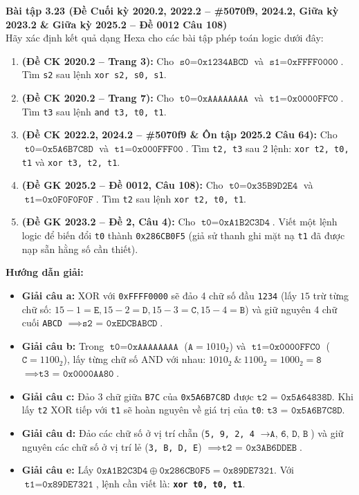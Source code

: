 \textbf{Bài tập 3.23 (Đề Cuối kỳ 2020.2, 2022.2 -- \#5070f9, 2024.2, Giữa kỳ 2023.2 \& Giữa kỳ 2025.2 -- Đề 0012 Câu 108)}\\
Hãy xác định kết quả dạng Hexa cho các bài tập phép toán logic dưới đây:
\begin{enumerate}[label=\alph*)]
    \item \textbf{(Đề CK 2020.2 -- Trang 3):} Cho $\texttt{s0} = \texttt{0x1234ABCD}$ và $\texttt{s1} = \texttt{0xFFFF0000}$. Tìm \texttt{s2} sau lệnh \texttt{xor s2, s0, s1}.
    \item \textbf{(Đề CK 2020.2 -- Trang 7):} Cho $\texttt{t0} = \texttt{0xAAAAAAAA}$ và $\texttt{t1} = \texttt{0x0000FFC0}$. Tìm \texttt{t3} sau lệnh \texttt{and t3, t0, t1}.
    \item \textbf{(Đề CK 2022.2, 2024.2 -- \#5070f9 \& Ôn tập 2025.2 Câu 64):} Cho $\texttt{t0} = \texttt{0x5A6B7C8D}$ và $\texttt{t1} = \texttt{0x000FFF00}$. Tìm \texttt{t2, t3} sau 2 lệnh: \texttt{xor t2, t0, t1} và \texttt{xor t3, t2, t1}.
    \item \textbf{(Đề GK 2025.2 -- Đề 0012, Câu 108):} Cho $\texttt{t0} = \texttt{0x35B9D2E4}$ và $\texttt{t1} = \texttt{0x0F0F0F0F}$. Tìm \texttt{t2} sau lệnh \texttt{xor t2, t0, t1}.
    \item \textbf{(Đề GK 2023.2 -- Đề 2, Câu 4):} Cho $\texttt{t0} = \texttt{0xA1B2C3D4}$. Viết một lệnh logic để biến đổi \texttt{t0} thành \texttt{0x286CB0F5} (giả sử thanh ghi mặt nạ \texttt{t1} đã được nạp sẵn hằng số cần thiết).
\end{enumerate}
\textbf{Hướng dẫn giải:}
\begin{itemize}
    \item \textbf{Giải câu a:} XOR với \texttt{0xFFFF0000} sẽ đảo 4 chữ số đầu \texttt{1234} (lấy $15$ trừ từng chữ số: $15-1=\texttt{E}, 15-2=\texttt{D}, 15-3=\texttt{C}, 15-4=\texttt{B}$) và giữ nguyên 4 chữ cuối \texttt{ABCD} $\implies \mathbf{\texttt{s2 = 0xEDCBABCD}}$.
    \item \textbf{Giải câu b:} Trong $\texttt{t0} = \texttt{0xAAAAAAAA}$ ($\texttt{A} = 1010_2$) và $\texttt{t1} = \texttt{0x0000FFC0}$ ($\texttt{C} = 1100_2$), lấy từng chữ số AND với nhau: $1010_2 \ \& \ 1100_2 = 1000_2 = \texttt{8}$ $\implies \mathbf{\texttt{t3 = 0x0000AA80}}$.
    \item \textbf{Giải câu c:} Đảo 3 chữ giữa \texttt{B7C} của \texttt{0x5A6B7C8D} được $\mathbf{\texttt{t2 = 0x5A64838D}}$. Khi lấy \texttt{t2} XOR tiếp với \texttt{t1} sẽ hoàn nguyên về giá trị của \texttt{t0}: $\mathbf{\texttt{t3 = 0x5A6B7C8D}}$.
    \item \textbf{Giải câu d:} Đảo các chữ số ở vị trí chẵn (\texttt{5, 9, 2, 4} $\rightarrow \texttt{A, 6, D, B}$) và giữ nguyên các chữ số ở vị trí lẻ (\texttt{3, B, D, E}) $\implies \mathbf{\texttt{t2 = 0x3AB6DDEB}}$.
    \item \textbf{Giải câu e:} Lấy $\texttt{0xA1B2C3D4} \oplus \texttt{0x286CB0F5} = \texttt{0x89DE7321}$. Với $\texttt{t1} = \texttt{0x89DE7321}$, lệnh cần viết là: \textbf{\texttt{xor t0, t0, t1}}.
\end{itemize}

